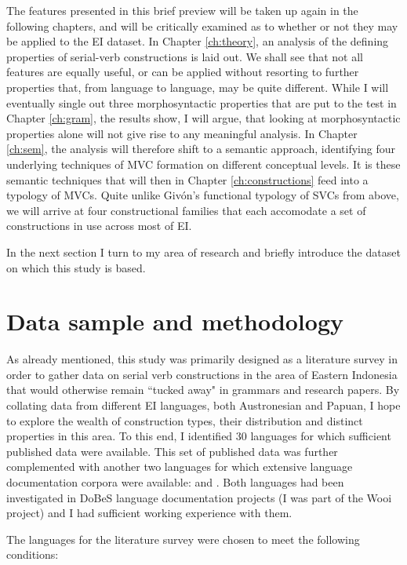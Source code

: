 The features presented in this brief preview will be taken up again in the following chapters, and will be critically examined as to whether or not they may be applied to the EI dataset. In Chapter \ref{ch:theory}, an analysis of the defining properties of serial-verb constructions is laid out. We shall see that not all features are equally useful, or can be applied without resorting to further properties that, from language to language, may be quite different. While I will eventually single out three morphosyntactic properties that are put to the test in Chapter \ref{ch:gram}, the results  show, I will argue, that looking at morphosyntactic properties alone will not give rise to any meaningful analysis. In Chapter \ref{ch:sem}, the analysis will therefore shift to a semantic approach, identifying four underlying techniques of MVC formation on different conceptual levels. It is these semantic techniques that will then in Chapter \ref{ch:constructions} feed into a typology of MVCs. Quite unlike Givón's functional typology of SVCs from above, we will arrive at four constructional families that each accomodate a set of constructions in use across most of EI.

In the next section I turn to my area of research and briefly introduce the dataset on which this study is based.

\section{Data sample and methodology}\label{sec:data}

As already mentioned, this study was primarily designed as a literature survey in order to gather data on serial verb constructions in the area of Eastern Indonesia that would otherwise remain ``tucked away" in grammars and research papers. By collating data from different EI languages, both Austronesian and Papuan, I hope to explore the wealth of construction types, their distribution and distinct properties in this area. To this end, I identified 30 languages for which sufficient published data were available. This set of published data was further complemented with another two languages for which extensive language documentation corpora were available:  and . Both languages had been investigated in DoBeS language documentation projects (I was part of the Wooi project) and I had sufficient working experience with them. 

The languages for the literature survey were chosen to meet the following conditions:

